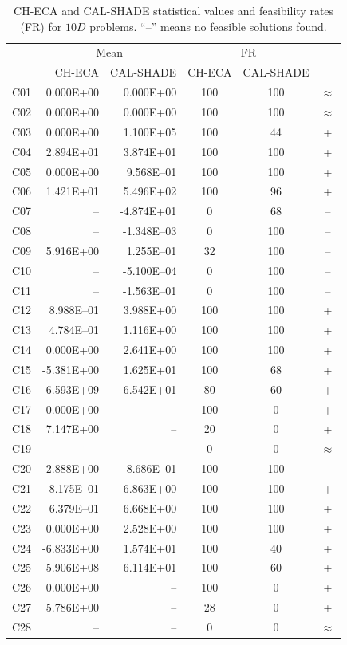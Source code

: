 \documentclass[conference]{IEEEtran}
\begin{document}
\begin{table}[!]
	\caption{CH-ECA and CAL-SHADE statistical values and feasibility rates (FR) for $10D$ problems. ``--'' means no feasible solutions found.}
	\centering
	\begin{tabular}{|c|r|r|c|c|c|}
	 \hline
	 &\multicolumn{2}{|c|}{Mean} & \multicolumn{2}{|c|}{FR} & \\
	\cline{2-5}
	    & CH-ECA & CAL-SHADE & CH-ECA & CAL-SHADE & \\ \hline
C01 & 0.000E+00 & 0.000E+00 &  100 &  100 & $\approx$ \\ 
C02 & 0.000E+00 & 0.000E+00 &  100 &  100 & $\approx$ \\ 
C03 & 0.000E+00 & 1.100E+05 &  100 &   44 & + \\ 
C04 & 2.894E+01 & 3.874E+01 &  100 &  100 & + \\ 
C05 & 0.000E+00 & 9.568E--01 &  100 &  100 & + \\ 
C06 & 1.421E+01 & 5.496E+02 &  100 &   96 & + \\ 
C07 &  -- & -4.874E+01 &    0 &   68 & -- \\ 
C08 &  -- & -1.348E--03 &    0 &  100 & -- \\ 
C09 & 5.916E+00 & 1.255E--01 &   32 &  100 & -- \\ 
C10 &  -- & -5.100E--04 &    0 &  100 & -- \\ 
C11 &  -- & -1.563E--01 &    0 &  100 & -- \\ 
C12 & 8.988E--01 & 3.988E+00 &  100 &  100 & + \\ 
C13 & 4.784E--01 & 1.116E+00 &  100 &  100 & + \\ 
C14 & 0.000E+00 & 2.641E+00 &  100 &  100 & + \\ 
C15 & -5.381E+00 & 1.625E+01 &  100 &   68 & + \\ 
C16 & 6.593E+09 & 6.542E+01 &   80 &   60 & + \\ 
C17 & 0.000E+00 &  -- &  100 &    0 & + \\ 
C18 & 7.147E+00 &  -- &   20 &    0 & + \\ 
C19 &  -- &  -- &    0 &    0 & $\approx$ \\ 
C20 & 2.888E+00 & 8.686E--01 &  100 &  100 & -- \\ 
C21 & 8.175E--01 & 6.863E+00 &  100 &  100 & + \\ 
C22 & 6.379E--01 & 6.668E+00 &  100 &  100 & + \\ 
C23 & 0.000E+00 & 2.528E+00 &  100 &  100 & + \\ 
C24 & -6.833E+00 & 1.574E+01 &  100 &   40 & + \\ 
C25 & 5.906E+08 & 6.114E+01 &  100 &   60 & + \\ 
C26 & 0.000E+00 &  -- &  100 &    0 & + \\ 
C27 & 5.786E+00 &  -- &   28 &    0 & + \\ 
C28 &  -- &  -- &    0 &    0 & $\approx$ \\ 
   \hline
	\end{tabular}
	\label{tab:d10c}
\end{table}
\end{document}
